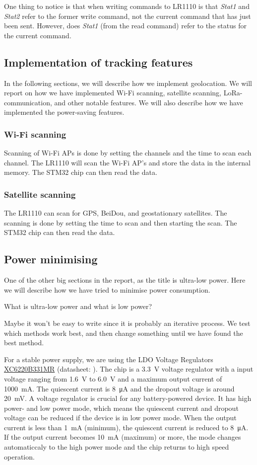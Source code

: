 One thing to notice is that when writing commands to LR1110 is that \textit{Stat1} and \textit{Stat2} refer to the former write command, not the current command that has just been sent. However, does \textit{Stat1} (from the read command) refer to the status for the current command.

\subsection{Implementation of tracking features}
In the following sections, we will describe how we implement geolocation. We will report on how we have implemented Wi-Fi scanning, satellite scanning, \ac{LoRa}-communication, and other notable features. We will also describe how we have implemented the power-saving features.

\subsubsection{Wi-Fi scanning}
Scanning of Wi-Fi \ac{AP}s is done by setting the channels and the time to scan each channel. The LR1110 will scan the Wi-Fi \ac{AP}'s and store the data in the internal memory. The STM32 chip can then read the data.

\subsubsection{Satellite scanning}
The LR1110 can scan for \ac{GPS}, BeiDou, and geostationary satellites. The scanning is done by setting the time to scan and then starting the scan. The STM32 chip can then read the data.

\subsection{Power minimising}
One of the other big sections in the report, as the title is ultra-low power. Here we will describe how we have tried to minimise power consumption.

What is ultra-low power and what is low power?

Maybe it won't be easy to write since it is probably an iterative process. We test which methods work best, and then change something until we have found the best method.


For a stable power supply, we are using the \ac{LDO} Voltage Regulators \hyperref[bom:xc6220]{XC6220B331MR} (datasheet: ). The chip is a \SI{3.3}{\volt} voltage regulator with a input voltage ranging from \SI{1.6}{\volt} to \SI{6.0}{\volt} and a maximum output current of \SI{1000}{\milli\ampere}. The quiescent current is \SI{8}{\micro\ampere} and the dropout voltage is around \SI{20}{\milli\volt}. A voltage regulator is crucial for any battery-powered device. It has high power- and low power mode, which means the quiescent current and dropout voltage can be reduced if the device is in low power mode. When the output current is less than \SI{1}{\milli\ampere} (minimum), the quiescent current is reduced to \SI{8}{\micro\ampere}. If the output current becomes \SI{10}{\milli\ampere} (maximum) or more, the mode changes automaticcaly to the high power mode and the chip returns to high speed operation.

